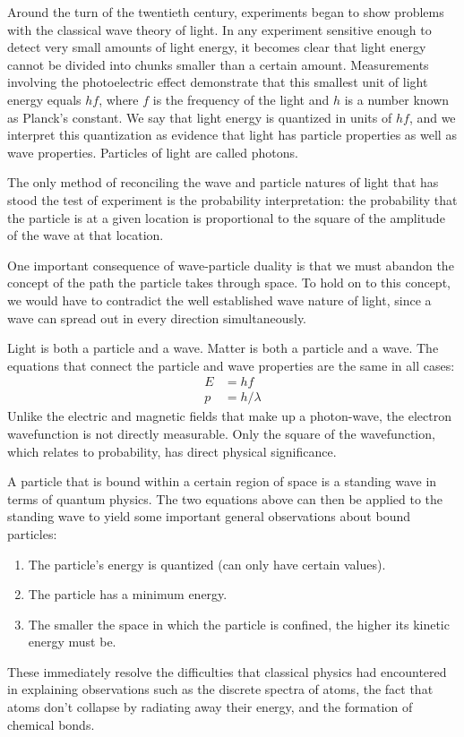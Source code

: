 Around the turn of the twentieth century, experiments began
to show problems with the classical wave theory of light. In
any experiment sensitive enough to detect very small amounts
of light energy, it becomes clear that light energy cannot
be divided into chunks smaller than a certain amount.
Measurements involving the photoelectric effect demonstrate
that this smallest unit of light energy equals $hf$,
where $f$ is the frequency of the light and $h$ is a number
known as Planck's constant. We say that light energy is
quantized in units of $hf$, and we interpret this
quantization as evidence that light has particle properties
as well as wave properties. Particles of light are called photons.

The only method of reconciling the wave and particle natures
of light that has stood the test of experiment is the
probability interpretation: the probability
that the particle is at a given location is proportional to
the square of the amplitude of the wave at that location.

One important consequence of wave-particle duality is that
we must abandon the concept of the path the particle takes
through space. To hold on to this concept, we would have to
contradict the well established wave nature of light, since
a wave can spread out in every direction simultaneously.

Light is both a particle and a wave. Matter is both
a particle and a wave. The equations that connect the
particle and wave properties are the same in all cases:
\begin{align*}
        E  &=  hf  \\
        p  &=  h/\lambda
\end{align*}
Unlike the electric and magnetic fields that make up a
photon-wave, the electron wavefunction is not directly
measurable. Only the square of the wavefunction, which
relates to probability, has direct physical significance.

A particle that is bound within a certain region of space is
a standing wave in terms of quantum physics. The two
equations above can then be applied to the standing wave to
yield some important general observations about bound particles:

\begin{enumerate}
\item The particle's energy is quantized (can only have certain values).

\item The particle has a minimum energy.

\item The smaller the space in which the particle is confined,
the higher its kinetic energy must be.
\end{enumerate}
These immediately resolve the difficulties that classical
physics had encountered in explaining observations such as
the discrete spectra of atoms, the fact that atoms don't
collapse by radiating away their energy, and the formation of chemical bonds.

